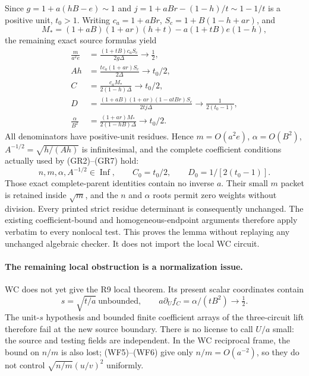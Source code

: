 Since $g=1+a(hB-e)\sim1$ and
$j=1+aBr-(1-h)/t\sim1-1/t$ is a positive unit, $t_0>1$.
Writing $c_a=1+aBr$, $S_c=1+B(1-h+ar)$, and
\[
 M_*=(1+aB)(1+ar)(h+t)-a(1+tB)e(1-h),
\]
the remaining exact source formulas yield
\[
\begin{aligned}
 \frac{m}{a^2e}
 &=\frac{(1+tB)c_aS_c}{2g\Delta}\longrightarrow\frac12,\\
 Ah&=\frac{tc_a(1+ar)S_c}{2\Delta}\longrightarrow t_0/2,\\
 C&=\frac{c_aM_*}{2(1-h)\Delta}\longrightarrow t_0/2,\\
 D&=\frac{(1+aB)(1+ar)(1-atBr)S_c}{2tj\Delta}
                                  \longrightarrow\frac1{2(t_0-1)},\\
 \frac{\alpha}{B^2}
 &=\frac{(1+ar)M_*}{2(1-hB)\Delta}\longrightarrow t_0/2.
\end{aligned}                                                     \tag{WF6}
\]
All denominators have positive-unit residues. Hence
$m=O(a^2e)$, $\alpha=O(B^2)$, $A^{-1/2}=\sqrt{h/(Ah)}$ is
infinitesimal, and the complete coefficient conditions actually
used by (GR2)--(GR7) hold:
\[
 n,m,\alpha,A^{-1/2}\in\operatorname{Inf},\qquad
 C_0=t_0/2,\qquad D_0=1/[2(t_0-1)].                  \tag{WF7}
\]
Those exact complete-parent identities contain no inverse $a$.
Their small $m$ packet is retained inside $\sqrt m$, and the
$n$ and $\alpha$ roots permit zero weights without division.
Every printed strict residue determinant is consequently unchanged.
The existing coefficient-bound and homogeneous-endpoint arguments
therefore apply verbatim to every nonlocal test. This proves the
lemma without replaying any unchanged algebraic checker. It does
not import the local WC circuit.

\paragraph{The remaining local obstruction is a normalization issue.}
WC does not yet give the R9 local theorem. Its present scalar
coordinates contain
\[
 s=\sqrt{t/a}\ \text{unbounded},\qquad
 a\partial_U f_C=\alpha/(tB^2)\longrightarrow\tfrac12.
                                                               \tag{WF8}
\]
The unit-$s$ hypothesis and bounded finite coefficient arrays of
the three-circuit lift therefore fail at the new source boundary.
There is no license to call $U/a$ small: the source and testing
fields are independent. In the WC reciprocal frame, the bound on
$n/m$ is also lost; (WF5)--(WF6) give only $n/m=O(a^{-2})$,
so they do not control $\sqrt{n/m}(u/v)^2$ uniformly.

